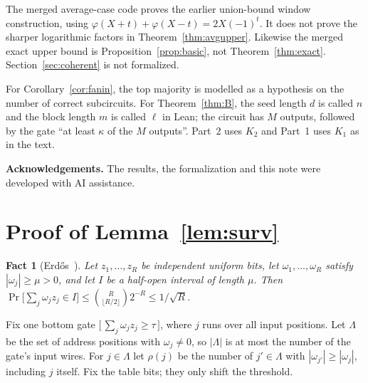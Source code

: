 \documentclass[11pt,letterpaper]{article}
\newtheorem{fact}[theorem]{Fact}
\theoremstyle{remark}
\newcommand{\ind}[1]{\bigl[\,#1\,\bigr]}
\newcommand{\sect}[1]{\section{\texorpdfstring{\color{ink}#1}{#1}}}
\newcommand{\smalltitle}[1]{\textbf{\color{ink}#1}\quad}
\begin{document}
The merged average-case code proves the earlier union-bound window
construction, using $\varphi(X+t)+\varphi(X-t)=2X(-1)^t$. It does not prove
the sharper logarithmic factors in Theorem~\ref{thm:avgupper}. Likewise the
merged exact upper bound is Proposition~\ref{prop:basic}, not
Theorem~\ref{thm:exact}. Section~\ref{sec:coherent} is not formalized.

For Corollary~\ref{cor:fanin}, the top majority is modelled as a hypothesis
on the number of correct subcircuits. For Theorem~\ref{thm:B}, the seed
length $d$ is called $n$ and the block length $m$ is called $\ell$ in Lean;
the circuit has $M$ outputs, followed by the gate ``at least $\kappa$ of the
$M$ outputs''. Part~2 uses $K_2$ and Part~1 uses $K_1$ as in the text.

\smalltitle{Acknowledgements.}
The results, the formalization and this note were developed with AI
assistance.

\appendix
\renewcommand{\thesection}{\Alph{section}}
\sect{Proof of Lemma~\ref{lem:surv}}\label{app:surv}

\begin{fact}[Erd\H{o}s~\cite{Erdos}]\label{fact:lo}
Let $z_1,\dots,z_R$ be independent uniform bits, let $\omega_1,\dots,\omega_R$
satisfy $|\omega_j|\ge\mu>0$, and let $I$ be a half-open interval of length
$\mu$. Then
$\Pr\bigl[\sum_j\omega_jz_j\in I\bigr]\le\binom{R}{\lfloor R/2\rfloor}2^{-R}\le1/\sqrt R$.
\end{fact}

Fix one bottom gate $\ind{\sum_j\omega_jz_j\ge\tau}$, where $j$ runs over
all input positions. Let $\Lambda$ be the set of address positions with
$\omega_j\ne0$, so $|\Lambda|$ is at most the number of the gate's input wires.
For $j\in \Lambda$ let $\rho(j)$ be the number of $j'\in \Lambda$ with
$|\omega_{j'}|\ge|\omega_j|$, including $j$ itself. Fix the table bits; they
only shift the threshold.
\end{document}
